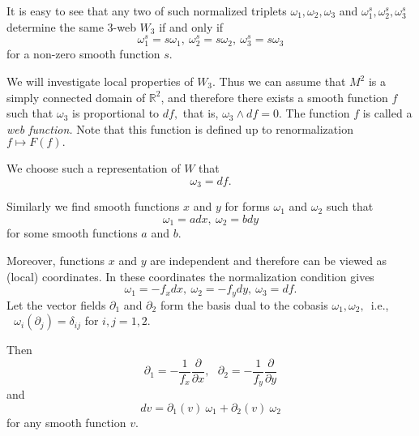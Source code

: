 \documentclass{article}
\begin{document}
It is easy to see that any two of such normalized triplets $\omega
_{1},\omega _{2},\omega _{3}$ and $\omega _{1}^{s},\omega _{2}^{s},\omega
_{3}^{s}$ determine the same $3$-web $W_{3}$ if and only if
\begin{equation}
\omega _{1}^{s}=s\omega _{1},\ \omega _{2}^{s}=s\omega _{2},\ \omega
_{3}^{s}=s\omega _{3}  \label{perenormirovka}
\end{equation}
for a non-zero smooth function $s.$

We will investigate local properties of $W_{3}.$ Thus we can assume that $%
M^{2}$ is a simply connected domain of $\mathbb{R}^{2}$, and therefore there
exists a smooth function $f$ such that $\omega _{3}$ is proportional to $df,$
that is, $\omega _{3}\wedge df=0.$ The function $f$ is called a \emph{web
function. }Note that this function is defined up to renormalization $%
f\longmapsto F\left( f\right) .$

We choose such a representation of $W$ that
\begin{equation}
\omega _{3}=df.  \label{normalized condition2}
\end{equation}

Similarly we find smooth functions $x$ and $y$ for forms $\omega _{1}$ and $%
\omega _{2}$ such that%
\begin{equation*}
\omega _{1}=adx,\ \omega _{2}=bdy
\end{equation*}%
for some smooth functions $a$ and $b.$

Moreover, functions $x$ and $y$ are independent and therefore can be viewed
as (local) coordinates. In these coordinates the normalization condition
gives
\begin{equation*}
\omega _{1}=-f_{x}dx,\ \omega _{2}=-f_{y}dy,\ \omega _{3}=df.
\end{equation*}%
Let the vector fields $\partial _{1}$ and $\partial _{2}$ form the basis
dual to the cobasis $\omega _{1},\omega _{2},$\ i.e.,$\ \ \ \omega
_{i}\left( \partial _{j}\right) =\delta _{ij}$ for $i,j=1,2.$

Then
\begin{equation*}
\partial _{1}=-\frac{1}{f_{x}}\frac{\partial }{\partial x},\ \ \ \partial
_{2}=-\frac{1}{f_{y}}\frac{\partial }{\partial y}
\end{equation*}
and
\begin{equation}
dv=\partial _{1}(v)~\omega _{1}+\partial _{2}\left( v\right) ~\omega _{2}
\label{differential}
\end{equation}
for any smooth function $v.$
\end{document}
